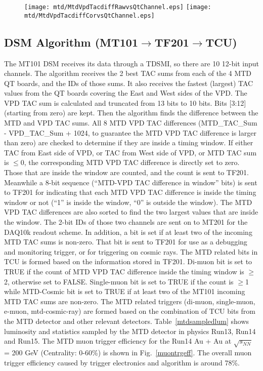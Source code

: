 \begin{figure}
\centering
\texttt{[image: mtd/MtdVpdTacdiffRawvsQtChannel.eps]}
\texttt{[image: mtd/MtdVpdTacdiffCorvsQtChannel.eps]}
\label{tacalignment}
\end{figure}

\subsection{DSM Algorithm (MT101$\rightarrow$TF201$\rightarrow$TCU)}
The MT101 DSM receives its data through a TDSMI, so there are 10 12-bit input channels. The algorithm receives the 2 best TAC sums from each of the 4 MTD QT boards, and the IDs of those sums. It also receives the fastest (largest) TAC values from the QT boards covering the East and West sides of the VPD. The VPD TAC sum is calculated and truncated from 13 bits to 10 bits. Bits [3:12] (starting from zero) are kept. Then the algorithm finds the difference between the MTD and VPD TAC sums. All 8 MTD VPD TAC differences (MTD\_TAC\_Sum - VPD\_TAC\_Sum + 1024, to guarantee the MTD VPD TAC difference is larger than zero) are checked to determine if they are inside a timing window. If either TAC from East side of VPD, or TAC from West side of VPD, or MTD TAC sum is $\leq$0, the corresponding MTD VPD TAC difference is directly set to zero. Those that are inside the window are counted, and the count is sent to TF201. Meanwhile a 8-bit sequence (``MTD-VPD TAC difference in window'' bits) is sent to TF201 for indicating that each MTD VPD TAC difference is inside the timing window or not (``1'' is inside the window, ``0'' is outside the window). The MTD VPD TAC differences are also sorted to find the two largest values that are inside the window. The 2-bit IDs of those two channels are sent on to MT201 for the DAQ10k readout scheme. In addition, a bit is set if at least two of the incoming MTD TAC sums is non-zero. That bit is sent to TF201 for use as a debugging and monitoring trigger, or for triggering on cosmic rays. The MTD related bits in TCU is formed based on the information stored in TF201. Di-muon bit is set to TRUE if the count of MTD VPD TAC difference inside the timing window is $\geq$2, otherwise set to FALSE. Single-muon bit is set to TRUE if the count is $\geq$1 while MTD-Cosmic bit is set to TRUE if at least two of the MT101 incoming MTD TAC sums are non-zero. The MTD related triggers (di-muon, single-muon, e-muon, mtd-cosmic-ray) are formed based on the combination of TCU bits from the MTD detector and other relevant detectors. Table~\ref{mtdsampledlum} shows luminosity and statistics sampled by the MTD detector in physics Run13, Run14 and Run15. The MTD muon trigger efficiency for the Run14 Au + Au at $\sqrt{s_{NN}}$ = 200 GeV (Centrality: 0-60\%) is shown in Fig.~\ref{muontrgeff}. The overall muon trigger efficiency caused by trigger electronics and algorithm is around 78\%.

